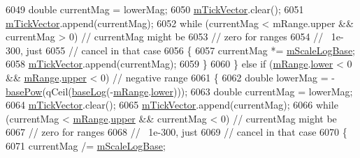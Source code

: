 \begin{DoxyCode}
6049       \textcolor{keywordtype}{double} currentMag = lowerMag;
6050       \hyperlink{class_q_c_p_axis_aae0f9b9973b85be601200f00f5825087}{mTickVector}.clear();
6051       \hyperlink{class_q_c_p_axis_aae0f9b9973b85be601200f00f5825087}{mTickVector}.append(currentMag);
6052       \textcolor{keywordflow}{while} (currentMag < mRange.upper && currentMag > 0) \textcolor{comment}{// currentMag might be}
6053                                                           \textcolor{comment}{// zero for ranges}
6054                                                           \textcolor{comment}{// ~1e-300, just}
6055                                                           \textcolor{comment}{// cancel in that case}
6056       \{
6057         currentMag *= \hyperlink{class_q_c_p_axis_abc727ddb4af745151755d1b5e60d03c3}{mScaleLogBase};
6058         \hyperlink{class_q_c_p_axis_aae0f9b9973b85be601200f00f5825087}{mTickVector}.append(currentMag);
6059       \}
6060     \} \textcolor{keywordflow}{else} \textcolor{keywordflow}{if} (\hyperlink{class_q_c_p_axis_a1ee36773c49062d751560e11f90845f7}{mRange}.\hyperlink{class_q_c_p_range_aa3aca3edb14f7ca0c85d912647b91745}{lower} < 0 && \hyperlink{class_q_c_p_axis_a1ee36773c49062d751560e11f90845f7}{mRange}.\hyperlink{class_q_c_p_range_ae44eb3aafe1d0e2ed34b499b6d2e074f}{upper} < 0) \textcolor{comment}{// negative range}
6061     \{
6062       \textcolor{keywordtype}{double} lowerMag = -\hyperlink{class_q_c_p_axis_a97d69f021a05126fcb978d0aefea47b8}{basePow}(qCeil(\hyperlink{class_q_c_p_axis_a1385765db2419ee5fb5505a6cf9130fb}{baseLog}(-\hyperlink{class_q_c_p_axis_a1ee36773c49062d751560e11f90845f7}{mRange}.\hyperlink{class_q_c_p_range_aa3aca3edb14f7ca0c85d912647b91745}{lower})));
6063       \textcolor{keywordtype}{double} currentMag = lowerMag;
6064       \hyperlink{class_q_c_p_axis_aae0f9b9973b85be601200f00f5825087}{mTickVector}.clear();
6065       \hyperlink{class_q_c_p_axis_aae0f9b9973b85be601200f00f5825087}{mTickVector}.append(currentMag);
6066       \textcolor{keywordflow}{while} (currentMag < \hyperlink{class_q_c_p_axis_a1ee36773c49062d751560e11f90845f7}{mRange}.\hyperlink{class_q_c_p_range_ae44eb3aafe1d0e2ed34b499b6d2e074f}{upper} && currentMag < 0) \textcolor{comment}{// currentMag might be}
6067                                                           \textcolor{comment}{// zero for ranges}
6068                                                           \textcolor{comment}{// ~1e-300, just}
6069                                                           \textcolor{comment}{// cancel in that case}
6070       \{
6071         currentMag /= \hyperlink{class_q_c_p_axis_abc727ddb4af745151755d1b5e60d03c3}{mScaleLogBase};

\end{DoxyCode}
